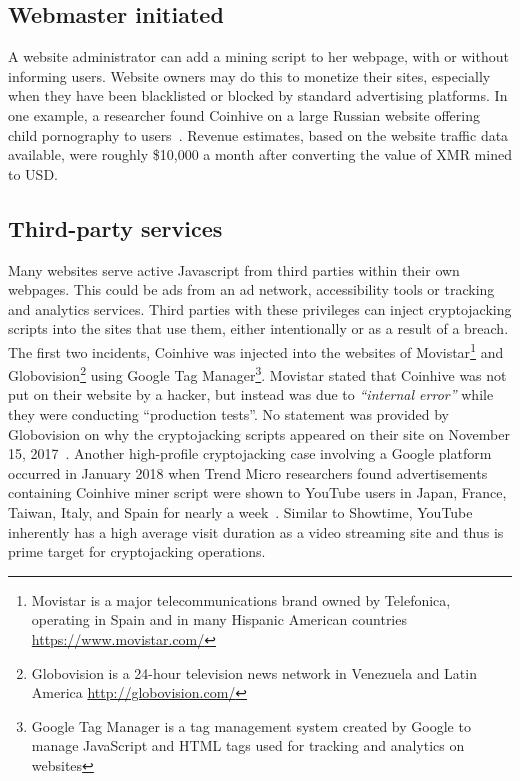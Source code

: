 \subsection{Webmaster initiated} 

A website administrator can add a mining script to her webpage, with or without informing users. Website owners may do this to monetize their sites, especially when they have been blacklisted or blocked by standard advertising platforms. In one example, a researcher found Coinhive on a large Russian website offering child pornography to users~\cite{coinhiveonchildporn}. Revenue estimates, based on the website traffic data available, were roughly \$10,000 a month after converting the value of XMR mined to USD.

\subsection{Third-party services} 

Many websites serve active Javascript from third parties within their own webpages. This could be ads from an ad network, accessibility tools or tracking and analytics services. Third parties with these privileges can inject cryptojacking scripts into the sites that use them, either intentionally or as a result of a breach. The first two incidents, Coinhive was injected into the websites of Movistar\footnote{Movistar is a major telecommunications brand owned by Telefonica, operating in Spain and in many Hispanic American countries \url{https://www.movistar.com/}} and Globovision\footnote{Globovision is a 24-hour television news network in Venezuela and Latin America \url{http://globovision.com/}} using Google Tag Manager\footnote{Google Tag Manager is a tag management system created by Google to manage JavaScript and HTML tags used for tracking and analytics on websites}. Movistar stated that Coinhive was not put on their website by a hacker, but instead was due to \textit{``internal error''} while they were conducting ``production tests''. No statement was provided by Globovision on why the cryptojacking scripts appeared on their site on November 15, 2017~\cite{googletagcoinhive}. Another high-profile cryptojacking case involving a Google platform occurred in January 2018 when Trend Micro researchers found advertisements containing Coinhive miner script were shown to YouTube users in Japan, France, Taiwan, Italy, and Spain for nearly a week~\cite{trendmicrocoinhive}. Similar to Showtime, YouTube inherently has a high average visit duration as a video streaming site and thus is prime target for cryptojacking operations.


